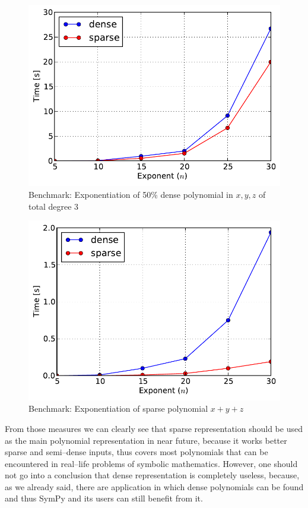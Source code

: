 \begin{figure}[htbp]
\centering

\includegraphics{50-dense-power.pdf}
\caption{Benchmark: Exponentiation of 50\% dense polynomial in $x,y,z$ of total degree 3\label{fig-50-dense-power}}\end{figure}
\begin{figure}[htbp]
\centering

\includegraphics{sparse-power.pdf}
\caption{Benchmark: Exponentiation of sparse polynomial $x + y + z$\label{fig-sparse-power}}\end{figure}

From those measures we can clearly see that sparse representation should be used as the main
polynomial representation in near future, because it works better sparse and semi--dense inputs,
thus covers most polynomials that can be encountered in real--life problems of symbolic mathematics.
However, one should not go into a conclusion that dense representation is completely useless, because,
as we already said, there are application in which dense polynomials can be found and thus SymPy and
its users can still benefit from it.
